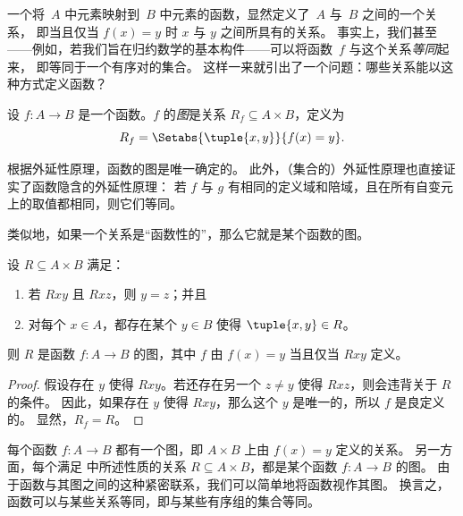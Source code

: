 \documentclass[../../../include/open-logic-section]{subfiles}
\begin{document}


\begin{explain}
一个将~$A$ 中元素映射到~$B$ 中元素的函数，显然定义了~$A$ 与~$B$ 之间的一个关系，
即当且仅当 $f(x) = y$ 时 $x$ 与 $y$ 之间所具有的关系。
事实上，我们甚至——例如，若我们旨在归约数学的基本构件——可以将函数~$f$ 与这个关系\emph{等同}起来，
即等同于一个有序对的集合。
这样一来就引出了一个问题：哪些关系能以这种方式定义函数？
\end{explain}

\begin{defn}[函数的图]
设 $f\colon A \to B$ 是一个函数。$f$ 的\emph{图}是关系 $R_f \subseteq A \times B$，定义为
\[
R_f = \Setabs{\tuple{x,y}}{f(x) = y}.
\]
\end{defn}

\begin{explain}
根据外延性原理，函数的图是唯一确定的。
此外，（集合的）外延性原理也直接证实了函数隐含的外延性原理：
若 $f$ 与 $g$ 有相同的定义域和陪域，且在所有自变元上的取值都相同，则它们等同。

类似地，如果一个关系是“函数性的”，那么它就是某个函数的图。
\end{explain}

\begin{prop}
设 $R \subseteq A \times B$ 满足：
\begin{enumerate}
\item 若 $Rxy$ 且 $Rxz$，则 $y = z$；并且
\item 对每个 $x \in A$，都存在某个 $y \in B$ 使得 $\tuple{x, y} \in R$。
\end{enumerate}
则 $R$ 是函数 $f\colon A \to B$ 的图，其中 $f$ 由 $f(x) = y$ 当且仅当 $Rxy$ 定义。
\end{prop}

\begin{proof}
假设存在 $y$ 使得 $Rxy$。若还存在另一个 $z \neq y$ 使得 $Rxz$，则会违背关于 $R$ 的条件。
因此，如果存在 $y$ 使得 $Rxy$，那么这个 $y$ 是唯一的，所以 $f$ 是良定义的。
显然，$R_f = R$。
\end{proof}

\begin{explain}
每个函数 $f\colon A \to B$ 都有一个图，即 $A \times B$ 上由 $f(x) = y$ 定义的关系。
另一方面，每个满足  中所述性质的关系 $R \subseteq A \times B$，都是某个函数 $f \colon A \to B$ 的图。
由于函数与其图之间的这种紧密联系，我们可以简单地将函数视作其图。
换言之，函数可以与某些关系等同，即与某些有序组的集合等同。
\end{explain}
\end{document}
